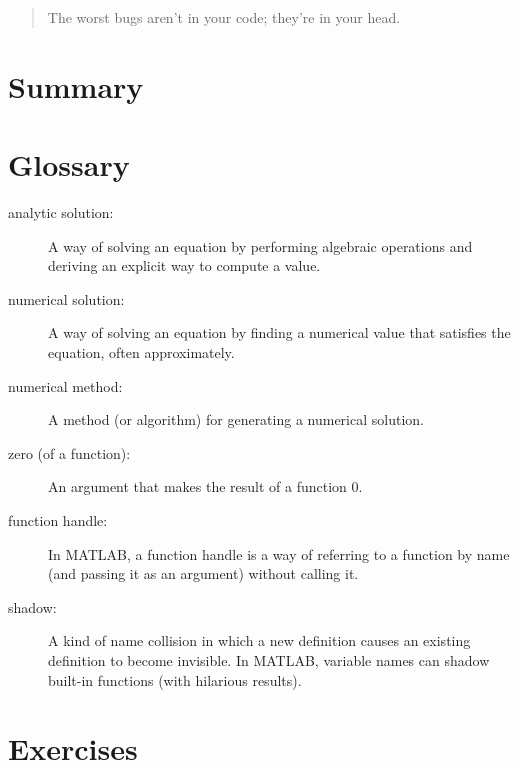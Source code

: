 \begin{quote}
The worst bugs aren't in your code; they're in your head.
\end{quote}

\section{Summary}


\section{Glossary}

\begin{description}

\item[analytic solution:] A way of solving an equation by performing
algebraic operations and deriving an explicit way to
compute a value.

\item[numerical solution:] A way of solving an equation by finding
a numerical value that satisfies the equation, often approximately.

\item[numerical method:] A method (or algorithm) for generating
a numerical solution.

\item[zero (of a function):] An argument that makes the result of a function $0$.

\item[function handle:] In MATLAB, a function handle is a way of
referring to a function by name (and passing it as an argument)
without calling it.

\item[shadow:] A kind of name collision in which a new definition
causes an existing definition to become invisible.  In MATLAB,
variable names can shadow built-in functions (with hilarious results).

\end{description}


\section{Exercises}

